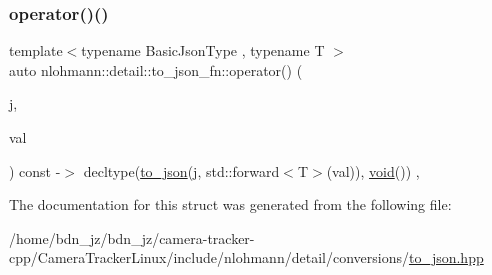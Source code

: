 \subsubsection{\texorpdfstring{operator()()}{operator()()}}
{\footnotesize\ttfamily template$<$typename Basic\+Json\+Type , typename T $>$ \\
auto nlohmann\+::detail\+::to\+\_\+json\+\_\+fn\+::operator() (\begin{DoxyParamCaption}\item[{Basic\+Json\+Type \&}]{j,  }\item[{T \&\&}]{val }\end{DoxyParamCaption}) const -\/$>$ decltype(\hyperlink{namespacenlohmann_1_1detail_a1a804b98cbe89b7e44b698f2ca860490}{to\+\_\+json}(j, std\+::forward$<$T$>$(val)), \hyperlink{namespacenlohmann_1_1detail_a59fca69799f6b9e366710cb9043aa77d}{void}())
    \hspace{0.3cm}{\ttfamily [inline]}, {\ttfamily [noexcept]}}



The documentation for this struct was generated from the following file\+:\begin{DoxyCompactItemize}
\item 
/home/bdn\+\_\+jz/bdn\+\_\+jz/camera-\/tracker-\/cpp/\+Camera\+Tracker\+Linux/include/nlohmann/detail/conversions/\hyperlink{to__json_8hpp}{to\+\_\+json.\+hpp}\end{DoxyCompactItemize}
